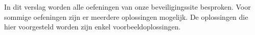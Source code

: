 In dit verslag worden alle oefeningen van onze beveiligingssite besproken.
Voor sommige oefeningen zijn er meerdere oplossingen mogelijk. 
De oplossingen die hier voorgesteld worden zijn enkel voorbeeldoplossingen.
